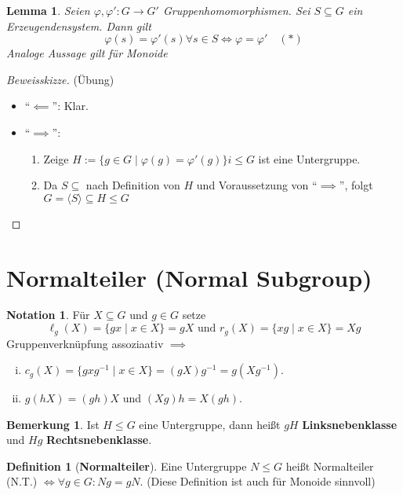 \documentclass[a4paper]{report}
\theoremstyle{plain}
\newtheorem{lemm}[thm]{Lemma}
\theoremstyle{definition}
\newtheorem{defi}[thm]{Definition}
\newtheorem*{bem*}{Bemerkung}
\newtheorem*{nota*}{Notation}
\begin{document}
\begin{lemm}
  Seien $\varphi, \varphi' : G \to G'$ Gruppenhomomorphismen. Sei $S \subseteq G$ ein Erzeugendensystem. Dann gilt
  $$\varphi(s) = \varphi'(s) \forall s \in S \iff \varphi = \varphi'\quad (*)$$
  Analoge Aussage gilt für Monoide
\end{lemm}
\begin{proof}[Beweisskizze](Übung)
  \begin{itemize}
          \item ``$\impliedby$'': Klar.
    \item ``$\implies$'':
          \begin{enumerate}[1)]
            \item Zeige $H := \{g \in G \mid \varphi(g) = \varphi'(g)\}i \le G$ ist eine Untergruppe.
            \item Da $S \subseteq$ nach Definition von $H$ und Voraussetzung von ``$\implies$'', folgt $G = \langle S \rangle \subseteq H \le G$
          \end{enumerate}
  \end{itemize}
\end{proof}
\section*{Normalteiler (Normal Subgroup)}
\begin{nota*}
  Für $X \subseteq G$ und $g \in G$ setze $$\ell_{g}(X) = \{gx \mid x \in X\} = gX \text{ und } r_{g}(X) = \{xg \mid x \in X\} = Xg$$
  Gruppenverknüpfung assoziaativ $\implies$
  \begin{enumerate}[(i)]
    \item $c_{g}(X) = \{gxg^{-1} \mid x \in X\} = (gX)g^{-1} = g(Xg^{-1})$.
    \item $g(hX) = (gh)X$ und $(Xg)h = X(gh)$.
  \end{enumerate}
\end{nota*}

\begin{bem*} Ist $H \le G$ eine Untergruppe, dann heißt $gH$ \textbf{Linksnebenklasse} und $Hg$ \textbf{Rechtsnebenklasse}.
\end{bem*}

\begin{defi}[\textbf{Normalteiler}]
  Eine Untergruppe $N \le G$ heißt Normalteiler (N.T.) $\iff \forall g \in G : Ng = gN$. (Diese Definition ist auch für Monoide sinnvoll)
\end{defi}
\end{document}
